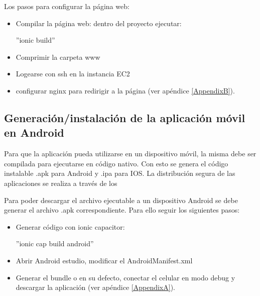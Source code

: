 Los pasos para configurar la página web:
\begin{itemize}
\item Compilar la página web: dentro del proyecto ejecutar:

''ionic build''
\item Comprimir la carpeta www
\item Logearse con ssh en la instancia EC2
\item configurar nginx para redirigir a la página (ver apéndice \ref{AppendixB}).

\end{itemize}
\subsection{Generación/instalación de la aplicación móvil en Android}

Para que la aplicación pueda utilizarse en un dispositivo móvil, la misma debe ser compilada para ejecutarse en código nativo. Con esto se genera el código instalable .apk para Android y .ipa para IOS. La distribución segura de las aplicaciones se realiza a través de los  

Para poder descargar el archivo ejecutable a un dispositivo Android se debe generar el archivo .apk correspondiente. Para ello seguir los siguientes pasos:

\begin{itemize}
\item Generar código con ionic capacitor:

''ionic cap build android''
\item Abrir Android estudio, modificar el AndroidManifest.xml
\item Generar el bundle o en su defecto, conectar el celular en modo debug y descargar la aplicación (ver apéndice \ref{AppendixA}).
\end{itemize}
\pagebreak


